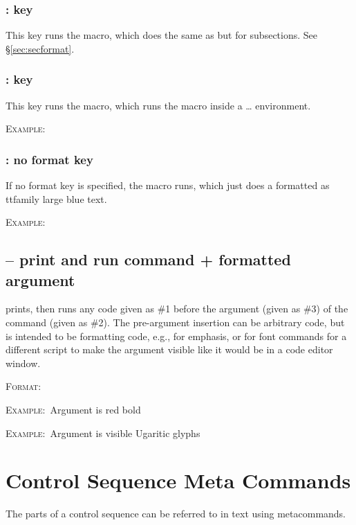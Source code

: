 \documentclass{article}
\newcommand{\ff}{\par\textsc{Format:~}}
\newcommand{\ee}{\par\textsc{Example:~}}
\begin{document}
\subsubsection{\cs{\cdrd}: \cdrd[format=general]{[format=subsection]} key}
This key runs the \cs{\cdrdsubsection} macro, which does the same as \cs{\cdrdsection} but for subsections. See \S\ref{sec:secformat}.

\subsubsection{\cs{\cdrd}: \cdrd[format=general]{[format=quote]} key}
This key runs the \cs{\cdrdquote} macro, which runs the \cs{\cdrdplain} macro inside a  \ldots  {} environment.
\ee
{}

\subsubsection{\cs{\cdrd}: no format key}
If no format key is specified, the \cs{\cdrdplain} macro runs, which just does a \codedetok{\detokenize} formatted as  ttfamily large blue text.
\ee
{}




\subsection{\cs{\cdpr} -- print and run command + formatted argument}
\cs{\cdpr} prints, then runs any code given as \#1 before the argument (given as \#3) of the command (given as \#2). The pre-argument insertion can be arbitrary code, but is intended to be formatting code, e.g., for emphasis, or for font commands for a different script to make the argument visible like it would be in a code editor window.
\ff\cs{\cdrq}
\ee Argument is red bold
\ee Argument is visible Ugaritic glyphs%

\section{Control Sequence Meta Commands}\label{sec:meta}
The parts of a control sequence can be referred to in text using metacommands.
\end{document}
